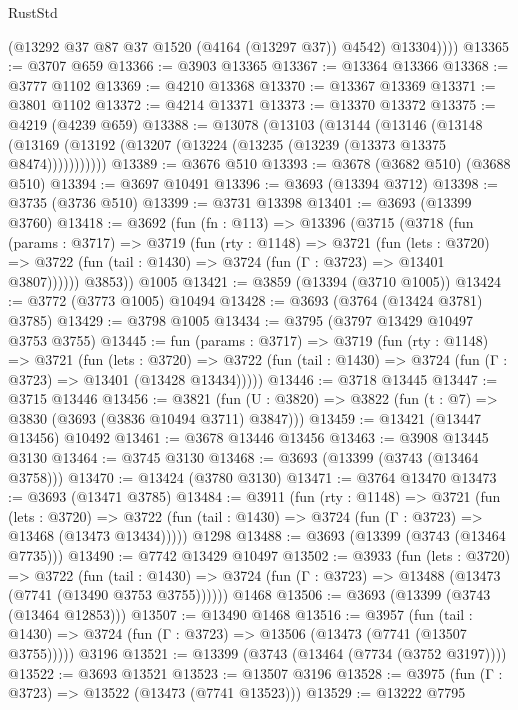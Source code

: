 \begin{lexlean}{RustStd}
\begin{coremodule}
            (@13292 @37 @87 @37 @1520 (@4164 (@13297 @37)) @4542)
            @13304))))
@13365 := @3707 @659
@13366 := @3903 @13365
@13367 := @13364 @13366
@13368 := @3777 @1102
@13369 := @4210 @13368
@13370 := @13367 @13369
@13371 := @3801 @1102
@13372 := @4214 @13371
@13373 := @13370 @13372
@13375 := @4219 (@4239 @659)
@13388 := @13078
    (@13103
      (@13144
        (@13146
          (@13148 (@13169 (@13192 (@13207 (@13224 (@13235 (@13239 (@13373 @13375 @8474)))))))))))
@13389 := @3676 @510
@13393 := @3678 (@3682 @510) (@3688 @510)
@13394 := @3697 @10491
@13396 := @3693 (@13394 @3712)
@13398 := @3735 (@3736 @510)
@13399 := @3731 @13398
@13401 := @3693 (@13399 @3760)
@13418 := @3692
    (fun (fn : @113) =>
    @13396
      (@3715
        (@3718
          (fun (params : @3717) =>
          @3719
            (fun (rty : @1148) =>
            @3721
              (fun (lets : @3720) =>
              @3722 (fun (tail : @1430) => @3724 (fun (Γ : @3723) => @13401 @3807))))))
        @3853))
    @1005
@13421 := @3859 (@13394 (@3710 @1005))
@13424 := @3772 (@3773 @1005) @10494
@13428 := @3693 (@3764 (@13424 @3781) @3785)
@13429 := @3798 @1005
@13434 := @3795 (@3797 @13429 @10497 @3753 @3755)
@13445 := fun (params : @3717) =>
  @3719
    (fun (rty : @1148) =>
    @3721
      (fun (lets : @3720) =>
      @3722 (fun (tail : @1430) => @3724 (fun (Γ : @3723) => @13401 (@13428 @13434)))))
@13446 := @3718 @13445
@13447 := @3715 @13446
@13456 := @3821
    (fun (U : @3820) => @3822 (fun (t : @7) => @3830 (@3693 (@3836 @10494 @3711) @3847)))
@13459 := @13421 (@13447 @13456) @10492
@13461 := @3678 @13446 @13456
@13463 := @3908 @13445 @3130
@13464 := @3745 @3130
@13468 := @3693 (@13399 (@3743 (@13464 @3758)))
@13470 := @13424 (@3780 @3130)
@13471 := @3764 @13470
@13473 := @3693 (@13471 @3785)
@13484 := @3911
    (fun (rty : @1148) =>
    @3721
      (fun (lets : @3720) =>
      @3722 (fun (tail : @1430) => @3724 (fun (Γ : @3723) => @13468 (@13473 @13434)))))
    @1298
@13488 := @3693 (@13399 (@3743 (@13464 @7735)))
@13490 := @7742 @13429 @10497
@13502 := @3933
    (fun (lets : @3720) =>
    @3722
      (fun (tail : @1430) =>
      @3724 (fun (Γ : @3723) => @13488 (@13473 (@7741 (@13490 @3753 @3755))))))
    @1468
@13506 := @3693 (@13399 (@3743 (@13464 @12853)))
@13507 := @13490 @1468
@13516 := @3957
    (fun (tail : @1430) => @3724 (fun (Γ : @3723) => @13506 (@13473 (@7741 (@13507 @3755)))))
    @3196
@13521 := @13399 (@3743 (@13464 (@7734 (@3752 @3197))))
@13522 := @3693 @13521
@13523 := @13507 @3196
@13528 := @3975 (fun (Γ : @3723) => @13522 (@13473 (@7741 @13523)))
@13529 := @13222 @7795

\end{coremodule}
\end{lexlean}
